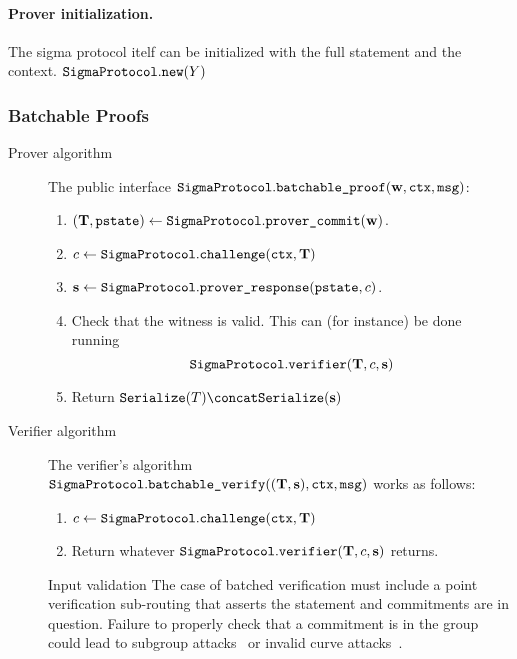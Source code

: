 \documentclass[11pt]{article}
\begin{document}
\paragraph{Prover initialization.}
  The sigma protocol itelf can be initialized with the full statement and the context. $\texttt{SigmaProtocol}.\texttt{new}(Y)$

\subsubsection{Batchable Proofs}

\begin{description}
\item[Prover algorithm]
The public interface $\texttt{SigmaProtocol}.\texttt{batchable\_proof}(\mathbf {w}, \texttt{ctx}, \texttt{msg})$:
\begin{enumerate}
\item
   $(\mathbf {T},\texttt{pstate})\gets\texttt{SigmaProtocol}.\texttt{prover\_commit}(\mathbf {w})$.
\item
$c \gets \texttt{SigmaProtocol}.\texttt{challenge}(\texttt{ctx}, \mathbf {T})$
\item
   $\mathbf {s}\gets\texttt{SigmaProtocol}.\texttt{prover\_response}(\texttt{pstate},  c)$.
   \item Check that the witness is valid. This can (for instance) be done running \[\texttt{SigmaProtocol}.\texttt{verifier}(\mathbf {T}, c, \mathbf {s})\]
   \item
  Return $\serialize(\commitment) \concat \serialize(\vec \response)$
\end{enumerate}
\item[Verifier algorithm] The verifier's algorithm $\texttt{SigmaProtocol}.\texttt{batchable\_verify}((\mathbf {T},\mathbf s), \texttt{ctx}, \texttt{msg})$ works as follows:
\begin{enumerate}
  \item
    $c \gets \texttt{SigmaProtocol}.\texttt{challenge}(\texttt{ctx}, \mathbf {T})$
  \item
    Return whatever $\texttt{SigmaProtocol}.\texttt{verifier}(\mathbf {T},c,\mathbf {s})$ returns.
\end{enumerate}
\begin{remark}{Input validation}{}
The case of batched verification must include a point verification sub-routing that asserts the statement and commitments are in question. Failure to properly check that a commitment is in the group could lead to subgroup attacks~\cite{EC:VanWie96,C:LimLee97} or invalid curve attacks~\cite{C:BieMeyMul00,RSA:BBPV12}.
\end{remark}
\end{description}
\end{document}

